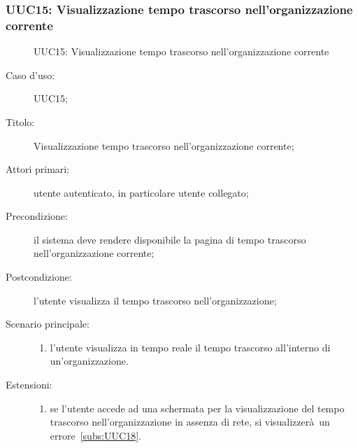 \documentclass[../../../analisi-dei-requisiti.tex]{subfiles}
\begin{document}
\subsubsection{UUC15: Visualizzazione tempo trascorso nell'organizzazione corrente}%
\label{subs:UUC15}

\begin{figure}[H]
  \centering
  \caption{UUC15: Visualizzazione tempo trascorso nell'organizzazione corrente}%
  \label{fig:UUC15}
\end{figure}

\begin{description}
  \item[Caso d'uso:] UUC15;
  \item[Titolo:] Visualizzazione tempo trascorso nell'organizzazione corrente;
  \item[Attori primari:] utente autenticato, in particolare utente collegato;
  \item[Precondizione:] il sistema deve rendere disponibile la pagina di tempo trascorso nell'organizzazione corrente;
  \item[Postcondizione:] l'utente visualizza il tempo trascorso nell'organizzazione;
  \item[Scenario principale:]
        \begin{enumerate}
          \item l'utente visualizza in tempo reale il tempo trascorso all'interno di un'organizzazione.
        \end{enumerate}
  \item[Estensioni:]
        \begin{enumerate}
          \item se l'utente accede ad una schermata per la visualizzazione del tempo trascorso nell'organizzazione in assenza di rete, si visualizzerà un errore~\ref{subs:UUC18}.
        \end{enumerate}
\end{description}
\end{document}
